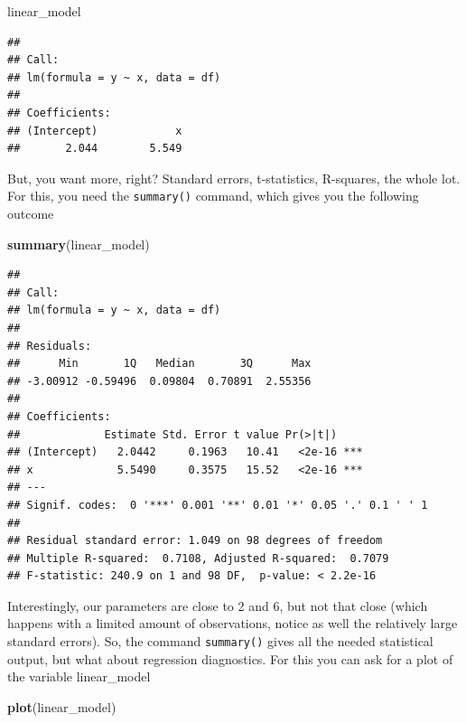 \documentclass[]{article}
\newenvironment{Shaded}{\begin{snugshade}}{\end{snugshade}}
\newcommand{\KeywordTok}[1]{\textcolor[rgb]{0.13,0.29,0.53}{\textbf{{#1}}}}
\newcommand{\NormalTok}[1]{{#1}}
\begin{document}
\begin{Shaded}
\begin{Highlighting}[]
\NormalTok{linear_model}
\end{Highlighting}
\end{Shaded}

\begin{verbatim}
## 
## Call:
## lm(formula = y ~ x, data = df)
## 
## Coefficients:
## (Intercept)            x  
##       2.044        5.549
\end{verbatim}

But, you want more, right? Standard errors, t-statistics, R-squares, the
whole lot. For this, you need the \texttt{summary()} command, which
gives you the following outcome

\begin{Shaded}
\begin{Highlighting}[]
\KeywordTok{summary}\NormalTok{(linear_model)}
\end{Highlighting}
\end{Shaded}

\begin{verbatim}
## 
## Call:
## lm(formula = y ~ x, data = df)
## 
## Residuals:
##      Min       1Q   Median       3Q      Max 
## -3.00912 -0.59496  0.09804  0.70891  2.55356 
## 
## Coefficients:
##             Estimate Std. Error t value Pr(>|t|)    
## (Intercept)   2.0442     0.1963   10.41   <2e-16 ***
## x             5.5490     0.3575   15.52   <2e-16 ***
## ---
## Signif. codes:  0 '***' 0.001 '**' 0.01 '*' 0.05 '.' 0.1 ' ' 1
## 
## Residual standard error: 1.049 on 98 degrees of freedom
## Multiple R-squared:  0.7108, Adjusted R-squared:  0.7079 
## F-statistic: 240.9 on 1 and 98 DF,  p-value: < 2.2e-16
\end{verbatim}

Interestingly, our parameters are close to 2 and 6, but not that close
(which happens with a limited amount of observations, notice as well the
relatively large standard errors). So, the command \texttt{summary()}
gives all the needed statistical output, but what about regression
diagnostics. For this you can ask for a plot of the variable
linear\_model

\begin{Shaded}
\begin{Highlighting}[]
\KeywordTok{plot}\NormalTok{(linear_model)}
\end{Highlighting}
\end{Shaded}
\end{document}
